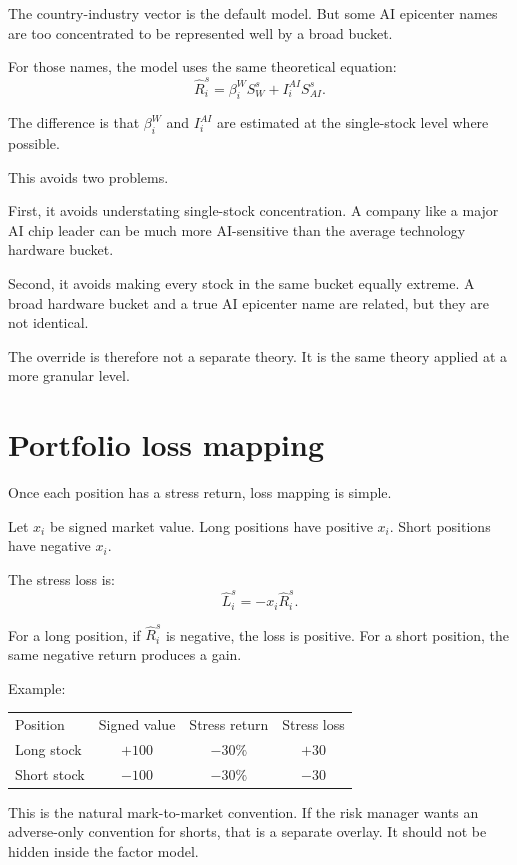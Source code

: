 \documentclass[10pt]{article}
\begin{document}
The country-industry vector is the default model. But some AI epicenter names are too concentrated to be represented well by a broad bucket.

For those names, the model uses the same theoretical equation:
\[
\widehat R_i^s=\beta_i^W S_W^s+I_i^{AI}S_{AI}^s.
\]

The difference is that $\beta_i^W$ and $I_i^{AI}$ are estimated at the single-stock level where possible.

This avoids two problems.

First, it avoids understating single-stock concentration. A company like a major AI chip leader can be much more AI-sensitive than the average technology hardware bucket.

Second, it avoids making every stock in the same bucket equally extreme. A broad hardware bucket and a true AI epicenter name are related, but they are not identical.

The override is therefore not a separate theory. It is the same theory applied at a more granular level.

\section{Portfolio loss mapping}

Once each position has a stress return, loss mapping is simple.

Let $x_i$ be signed market value. Long positions have positive $x_i$. Short positions have negative $x_i$.

The stress loss is:
\[
\widehat L_i^s=-x_i\widehat R_i^s.
\]

For a long position, if $\widehat R_i^s$ is negative, the loss is positive. For a short position, the same negative return produces a gain.

Example:

\begin{center}
\begin{tabular}{lccc}
Position & Signed value & Stress return & Stress loss \\
Long stock & $+100$ & $-30\%$ & $+30$ \\
Short stock & $-100$ & $-30\%$ & $-30$
\end{tabular}
\end{center}

This is the natural mark-to-market convention. If the risk manager wants an adverse-only convention for shorts, that is a separate overlay. It should not be hidden inside the factor model.
\end{document}
